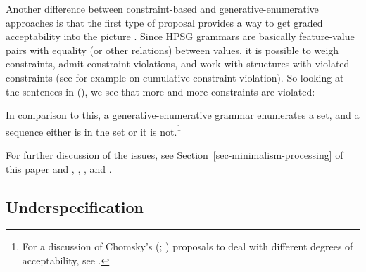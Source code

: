 \documentclass[output=paper
                ,modfonts
                ,nonflat
	        ,collection
	        ,collectionchapter
	        ,collectiontoclongg
 	        ,biblatex
                ,babelshorthands
                ,newtxmath
                ,draftmode
                ,colorlinks, citecolor=brown
]{./langsci/langscibook}
\begin{document}
Another difference between constraint-based and generative-enumerative approaches is that the first
type of proposal provides a way to get graded acceptability into the picture \citep[Section~3.1]{PS2001a}. Since HPSG grammars
are basically feature-value pairs with equality (or other relations) between values, it is possible
to weigh constraints, admit constraint violations, and work with structures with
violated constraints (see for example \citealp{SK2005a} on cumulative constraint violation). So looking at the sentences in (), we see that more and more constraints
are violated:
\eal
{}
\zl

\noindent
In comparison to this, a generative-enumerative grammar enumerates a set, and a
sequence either is in the set or it is not.\footnote{%
For a discussion of Chomsky's
(\citeyear{Chomsky64a}; \citeyear[Chapter~5]{Chomsky75a}) proposals to deal with different degrees
of acceptability, see .
}


For further discussion of the issues, see Section~\ref{sec-minimalism-processing} of
this paper and \eg \citet{PS2001a}, \citet{Postal2003a}, \citeauthor{SW2011a}
\citeyearpar{SW2011a,SW2015a}, and .  

\subsection{Underspecification}
\end{document}
